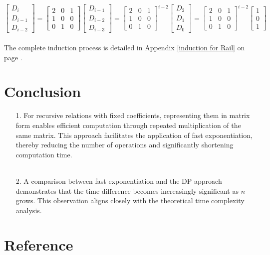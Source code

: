 $$
\begin{bmatrix}
    D_i\\
    D_{i - 1}\\
    D_{i - 2}
\end{bmatrix} = 
\begin{bmatrix}
    2 & 0 & 1\\
    1 & 0 & 0\\
    0 & 1 & 0
\end{bmatrix}
\begin{bmatrix}
    D_{i - 1}\\
    D_{i - 2}\\
    D_{i - 3}
\end{bmatrix} = 
\begin{bmatrix}
    2 & 0 & 1\\
    1 & 0 & 0\\
    0 & 1 & 0
\end{bmatrix}^{i - 2}
\begin{bmatrix}
    D_2\\
    D_1\\
    D_0
\end{bmatrix} = 
\begin{bmatrix}
    2 & 0 & 1\\
    1 & 0 & 0\\
    0 & 1 & 0
\end{bmatrix}^{i - 2}
\begin{bmatrix}
    1\\
    0\\
    1
\end{bmatrix}
$$\\

The complete induction process is detailed in Appendix \ref{induction for Rail} on page \pageref{induction for Rail}.

\section{Conclusion}
\label{conclusion}

\begin{enumerate}
    \item[1.] For recursive relations with fixed coefficients, representing them in matrix form enables efficient computation through repeated multiplication of the same matrix. This approach facilitates the application of fast exponentiation, thereby reducing the number of operations and significantly shortening computation time.\\\
    \item[2.] A comparison between fast exponentiation and the DP approach demonstrates that the time difference becomes increasingly significant as $n$ grows. This observation aligns closely with the theoretical time complexity analysis.
\end{enumerate}

\section{Reference}